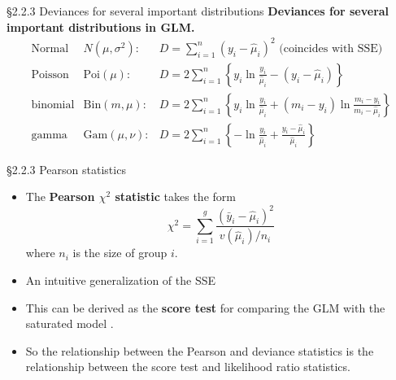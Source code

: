 \documentclass{beamer}
\newenvironment{wideitemize}%
  {\begin{itemize}%
    \setlength{\parskip}{1em}}%
  {\end{itemize}}
\begin{document}
\begin{frame}{\S2.2.3 Deviances for several important distributions}
\textbf{Deviances for several important distributions in GLM.}
\begin{eqnarray*}
\mbox{Normal}\!\!\! & N(\mu,\sigma^2): & D=
\sum_{i=1}^n (y_i-\hat{\mu}_i)^2 \text{ (coincides with SSE)}\\ 
\mbox{Poisson}\!\!\! &\mbox{Poi}(\mu): &  D=2\sum_{i=1}^n
\left\{y_i\ln\frac{y_i}{\hat{\mu}_i}-(y_i-\hat{\mu}_i)\right\} \\
\mbox{binomial}\!\!\! & \mbox{Bin}(m,\mu): & D=2\sum_{i=1}^n
\left\{y_i\ln\frac{y_i}{\hat{\mu}_i}\!+\!(\!m_i\!-\!y_i\!)\ln\frac{m_i\!-\!y_i}{m_i\!-\!\hat{\mu}_i}\right\} \\
\mbox{gamma} \!\!\!& \mbox{Gam}(\mu,\nu): & D=2\sum_{i=1}^n
\left\{-\ln\frac{y_i}{\hat{\mu}_i}+\frac{y_i-\hat{\mu}_i}{\hat{\mu}_i}\right\}
\end{eqnarray*}
\end{frame}



\begin{frame}{\S2.2.3 Pearson statistics }
\begin{wideitemize}

\item
The \textbf{Pearson $\chi^2$ statistic} takes the form 
\[
\chi^2=\sum_{i=1}^g \frac{(\bar{y}_i-\hat{\mu}_i)^2}{v(\hat{\mu}_i)/n_i}
\]
where  $n_i$ is the size of group $i$.

\item An intuitive generalization of the SSE

\item This can be derived as the {\bf score test} for comparing the GLM with the saturated model \cite{smyth2003pearson, Lovison2005}.

\item  So the relationship between the Pearson and deviance  statistics is the relationship between the score test and likelihood ratio statistics. 
\end{wideitemize}
\end{frame}
\end{document}
